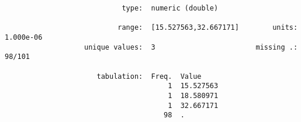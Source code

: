 \documentclass{article}
\begin{document}
\begin{verbatim}
                            type:  numeric (double)
          
                           range:  [15.527563,32.667171]        units:  1.000e-06
                   unique values:  3                        missing .:  98/101
          
                      tabulation:  Freq.  Value
                                       1  15.527563
                                       1  18.580971
                                       1  32.667171
                                      98  .
          
          
          
          
          
          
\end{verbatim}
\end{document}
